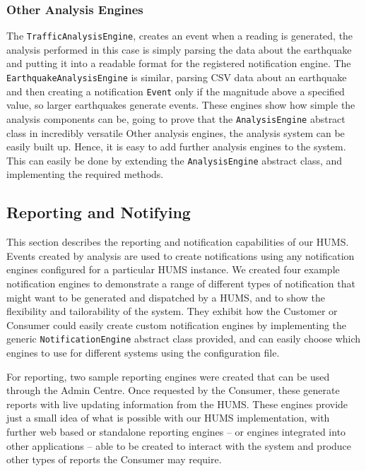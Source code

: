 \documentclass[10pt,a4paper]{article}
\begin{document}

\subsubsection{Other Analysis Engines}
The \texttt{TrafficAnalysisEngine}, creates an event when a reading is generated, the analysis performed in this case is simply parsing the data about the earthquake and putting it into a readable format for the registered notification engine. The \texttt{EarthquakeAnalysisEngine} is similar, parsing CSV data about an earthquake and then creating a notification \texttt{Event} only if the magnitude above a specified value, so larger earthquakes generate events. These engines show how simple the analysis components can be, going to prove that the \texttt{AnalysisEngine} abstract class in incredibly versatile  Other analysis engines, the analysis system can be easily built up. Hence, it is easy to add further analysis engines to the system. This can easily be done by extending the \texttt{AnalysisEngine} abstract class, and implementing the required methods.


\subsection{Reporting and Notifying}
\label{sec:reporting}

This section describes the reporting and notification capabilities of our HUMS. Events created by analysis are used to create notifications using any notification engines configured for a particular HUMS instance. We created four example notification engines to demonstrate a range of different types of notification that might want to be generated and dispatched by a HUMS, and to show the flexibility and tailorability of the system. They exhibit how the Customer or Consumer could easily create custom notification engines by implementing the generic \texttt{NotificationEngine} abstract class provided, and can easily choose which engines to use for different systems using the configuration file.

For reporting, two sample reporting engines were created that can be used through the Admin Centre. Once requested by the Consumer, these generate reports with live updating information from the HUMS. These engines provide just a small idea of what is possible with our HUMS implementation, with further web based or standalone reporting engines -- or engines integrated into other applications -- able to be created to interact with the system and produce other types of reports the Consumer may require.
\end{document}
